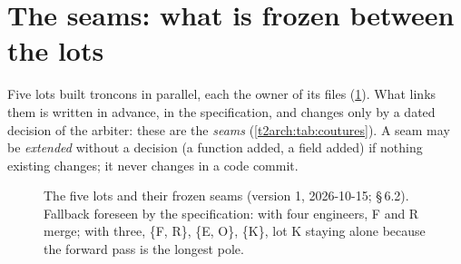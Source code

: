\section{The seams: what is frozen between the lots}\label{t2arch:sec:coutures}

Five lots built troncons in parallel, each the owner of its files (\cref{t2arch:fig:lots}). What links them is written in advance, in the specification, and changes only by a dated decision of the arbiter: these are the \emph{seams} (\cref{t2arch:tab:coutures}). A seam may be \emph{extended} without a decision (a function added, a field added) if nothing existing changes; it never changes in a code commit.

\begin{figure}[ht]
\centering
\TdArchLots
\caption[The five lots and their seams]{The five lots and their frozen seams (version 1, 2026-10-15;  §\,6.2). Fallback foreseen by the specification: with four engineers, F and R merge; with three, \{F, R\}, \{E, O\}, \{K\}, lot K staying alone because the forward pass is the longest pole.}
\label{t2arch:fig:lots}
\end{figure}


